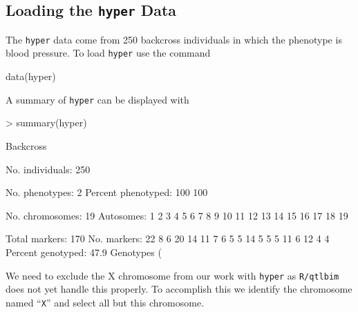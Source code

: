 \documentclass[12pt]{article}
\begin{document}
\subsection{Loading the {\tt hyper} Data}
The {\tt hyper} data come from 250 backcross individuals in which the 
phenotype is blood pressure. To load {\tt hyper} use the command
\begin{Schunk}
\begin{Sinput}
data(hyper)
\end{Sinput}
\end{Schunk}
A summary of {\tt hyper} can be displayed with 
\begin{Schunk}
\begin{Sinput}
> summary(hyper)
\end{Sinput}
\begin{Soutput}
    Backcross

    No. individuals:    250 

    No. phenotypes:     2 
    Percent phenotyped: 100 100 

    No. chromosomes:    19 
        Autosomes:      1 2 3 4 5 6 7 8 9 10 11 12 13 14 15 16 17 18 19 

    Total markers:      170 
    No. markers:        22 8 6 20 14 11 7 6 5 5 14 5 5 5 11 6 12 4 4 
    Percent genotyped:  47.9 
    Genotypes (%
\end{Soutput}
\end{Schunk}
We need to exclude the X chromosome from our work with {\tt hyper} as 
{\tt R/qtlbim} does not yet handle this properly.  To 
accomplish this we identify the chromosome named ``{\tt X}'' and select all 
but this chromosome.   
\begin{Schunk}
\end{Schunk}
\end{document}

